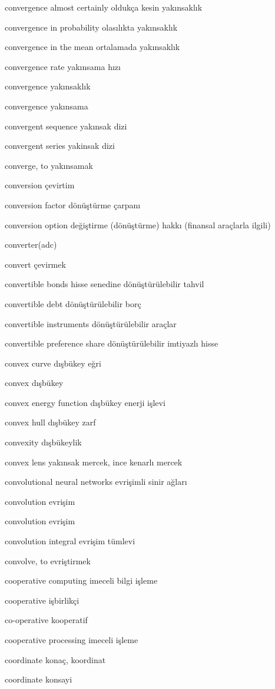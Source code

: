 \documentclass[12pt,fleqn]{article}\usepackage{../../common}
\begin{document}
convergence almost certainly oldukça kesin yakınsaklık

convergence in probability olasılıkta yakınsaklık

convergence in the mean ortalamada yakınsaklık

convergence rate yakınsama hızı

convergence yakınsaklık

convergence yakınsama

convergent sequence yakınsak dizi

convergent series yakinsak dizi

converge, to yakınsamak

conversion çevirtim

conversion factor dönüştürme çarpanı

conversion option değiştirme (dönüştürme) hakkı (finansal araçlarla ilgili)

converter(adc)

convert çevirmek

convertible bonds hisse senedine dönüştürülebilir tahvil

convertible debt dönüştürülebilir borç

convertible instruments dönüştürülebilir araçlar

convertible preference share dönüştürülebilir imtiyazlı hisse

convex curve dışbükey eğri

convex dışbükey

convex energy function dışbükey enerji işlevi

convex hull dışbükey zarf

convexity dışbükeylik

convex lens yakınsak mercek, ince kenarlı mercek

convolutional neural networks evrişimli sinir ağları

convolution evrişim

convolution evrişim

convolution integral evrişim tümlevi

convolve, to evriştirmek

cooperative computing imeceli bilgi işleme

cooperative işbirlikçi

co-operative kooperatif

cooperative processing imeceli işleme

coordinate konaç, koordinat

coordinate konsayi
\end{document}
